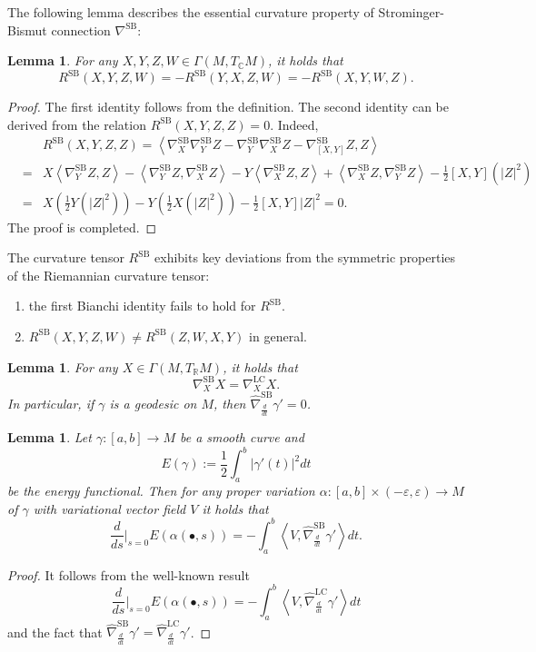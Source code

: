 \documentclass[12pt, reqno]{amsart}
\theoremstyle{plain}
\newtheorem{lemma}[thm]{Lemma}
\theoremstyle{definition}
\newcommand{\elemma}{\end{lemma}}
\newcommand{\blemma}{\begin{lemma}}
\newcommand{\eps}{\varepsilon}
\newcommand{\beq}{\begin{equation}}
\newcommand{\eeq}{\end{equation}}
\newcommand{\ee}{\end{eqnarray*}}
\newcommand{\be}{\begin{eqnarray*}}
\newcommand{\bd}{\begin{enumerate}}
\newcommand{\ed}{\end{enumerate}}
\renewcommand{\hat}{\widehat}
\renewcommand{\>}{\rightarrow}
\newcommand{\C}{{\mathbb C}}
\newcommand{\R}{{\mathbb R}}
\newcommand{\LL}{\left\langle}
\newcommand{\RL}{\right\rangle}
\newcommand{\MS}{\mathrm{SB}}
\newcommand{\MLC}{\mathrm{LC}}
\renewcommand{\>}{\rightarrow}
\numberwithin{equation}{section} %
\begin{document}
\noindent  The following lemma describes the essential curvature property of  Strominger-Bismut connection $\nabla^{\MS}$:   \begin{lemma}
    For any $X,Y,Z,W\in\Gamma(M,T_\C M)$, it holds that
    \beq
    R^{\MS}(X,Y,Z,W)=-R^{\MS}(Y,X,Z,W)=-R^{\MS}(X,Y,W,Z).\label{skewsymmetry}
    \eeq
   \end{lemma}
   \begin{proof} The first identity follows from the definition. The second identity can be derived from  the relation $    R^{\MS}(X,Y,Z,Z)=0$.
    Indeed,
    \be
    &&  R^{\MS}(X,Y,Z,Z)=\LL\nabla^{\MS}_X\nabla^{\MS}_YZ-\nabla^{\MS}_Y\nabla^{\MS}_XZ-\nabla^{\MS}_{[X,Y]}Z,Z\RL\\
    &=&X\LL\nabla^{\MS}_YZ,Z\RL-\LL\nabla^{\MS}_YZ,\nabla^{\MS}_X Z\RL-Y\LL\nabla^{\MS}_XZ,Z\RL+\LL\nabla^{\MS}_XZ,\nabla^{\MS}_Y Z\RL-\frac{1}{2}[X,Y](|Z|^2)\\
    &=&X\left(\frac{1}{2}Y(|Z|^2)\right)-Y\left(\frac{1}{2}X(|Z|^2)\right)-\frac{1}{2}[X,Y]|Z|^2=0.
    \ee
    The proof is completed.
   \end{proof}


\noindent The curvature tensor $R^{\MS}$
exhibits key deviations from  the symmetric properties of the Riemannian curvature tensor:
\bd \item   the first Bianchi identity fails to hold for $R^{\MS}$. 
\item    $R^{\MS}(X,Y,Z,W)\neq R^{\MS}(Z,W,X,Y)$ in general.
\ed 


   \blemma
    For any $X\in\Gamma(M,T_\R M)$, it holds that
    \beq
    \nabla^{\MS}_XX=\nabla^{\MLC}_XX.
    \eeq
    In particular, if $\gamma$ is a geodesic on $M$, then $\hat{\nabla}^{\MS}_{\frac{d}{dt}}\gamma'=0$.
   \elemma


   \blemma
    Let $\gamma:[a,b]\to M$ be a smooth curve and
    \beq
    E(\gamma):=\frac{1}{2}\int_a^b|\gamma'(t)|^2dt
    \eeq
    be the energy functional. Then for any proper variation $\alpha:[a,b]\times(-\eps,\eps)\to M$ of $\gamma$ with variational vector field $V$  it holds that
    \beq
    \frac{d}{d s}\bigg|_{s=0}E(\alpha(\bullet,s))=-\int_a^b\LL V,\hat{\nabla}^\MS_{\frac{d}{dt}}\gamma'\RL dt.
    \eeq
   \elemma
   \begin{proof}
    It follows from the well-known result
    \beq
    \frac{d}{d s}\bigg|_{s=0}E(\alpha(\bullet,s))=-\int_a^b\LL V,\hat{\nabla}_{\frac{d}{dt}}^{\text{LC}}\gamma'\RL dt
    \eeq
    and the fact that $\hat{\nabla}^\MS_{\frac{d}{dt}}\gamma'=\hat{\nabla}^{\MLC}_{\frac{d}{dt}}\gamma'$.
   \end{proof}
\end{document}
